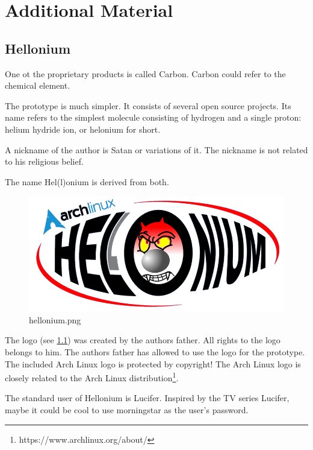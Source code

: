\chapter{Additional Material}

\section{Hellonium}
\label{app:hellonium}

One ot the proprietary products is called Carbon. Carbon could refer to the chemical element.
\newline

\noindent The prototype is much simpler. It consists of several open source projects. Its name refers to the simplest molecule consisting of hydrogen and a single proton: helium hydride ion, or helonium for short.
\newline

\noindent A nickname of the author is Satan or variations of it. The nickname is not related to his religious belief.
\newline

\noindent The name Hel(l)onium is derived from both.
\newline

\begin{figure}[htbp]  %
  \centering
  \includegraphics[width=.5\textwidth]{figures/hellonium.png}
  \caption[Logo of Hel(l)onium]{hellonium.png}
  \label{fig:hellonium.png}
\end{figure}

\noindent The logo (see \cref{fig:hellonium.png}) was created by the authors father. All rights to the logo belongs to him. The authors father has allowed to use the logo for the prototype. The included Arch Linux logo is protected by copyright! The Arch Linux logo is closely related to the Arch Linux distribution\footnote{https://www.archlinux.org/about/}.
\newline

\noindent The standard user of Hellonium is Lucifer. Inspired by the TV series Lucifer, maybe it could be cool to use morningstar as the user's password.